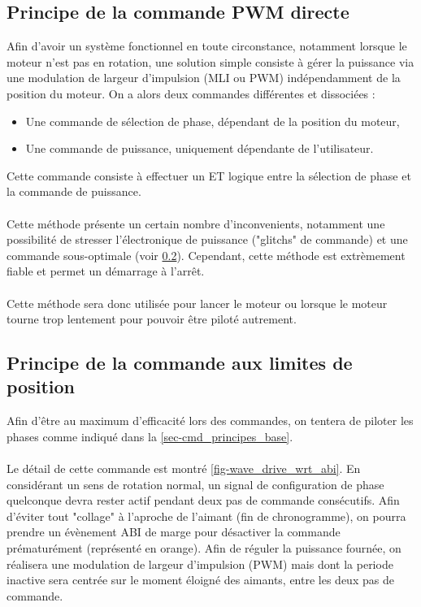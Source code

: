 \subsection{Principe de la commande PWM directe}

Afin d'avoir un système fonctionnel en toute circonstance, notamment lorsque le moteur n'est pas en rotation, 
une solution simple consiste à gérer la puissance via une modulation de largeur d'impulsion (MLI ou PWM) indépendamment de la position du moteur.
On a alors deux commandes différentes et dissociées :
\begin{itemize}
    \item Une commande de sélection de phase, dépendant de la position du moteur,
    \item Une commande de puissance, uniquement dépendante de l'utilisateur.
\end{itemize}

Cette commande consiste à effectuer un ET logique entre la sélection de phase et la commande de puissance.

\paragraph{}
Cette méthode présente un certain nombre d'inconvenients, notamment une possibilité de stresser l'électronique de puissance ("glitchs" de commande) et une commande sous-optimale (voir \cref{sec-cmd_limite_position}).
Cependant, cette méthode est extrèmement fiable et permet un démarrage à l'arrêt. 

\paragraph{}
Cette méthode sera donc utilisée pour lancer le moteur ou lorsque le moteur tourne trop lentement pour pouvoir être piloté autrement.

\subsection{Principe de la commande aux limites de position}
\label{sec-cmd_limite_position}
Afin d'être au maximum d'efficacité lors des commandes, on tentera de piloter les phases comme indiqué dans la \cref{sec-cmd_principes_base}.

\paragraph{}
Le détail de cette commande est montré \cref{fig-wave_drive_wrt_abi}. 
En considérant un sens de rotation normal, un signal de configuration de phase quelconque devra rester actif pendant deux pas de commande consécutifs.
Afin d'éviter tout "collage" à l'aproche de l'aimant (fin de chronogramme), on pourra prendre un évènement ABI de marge pour désactiver la commande prématurément (représenté en orange).
Afin de réguler la puissance fournée, on réalisera une modulation de largeur d'impulsion (PWM) mais dont la periode inactive sera centrée sur le moment éloigné des aimants, entre les deux pas de commande.

